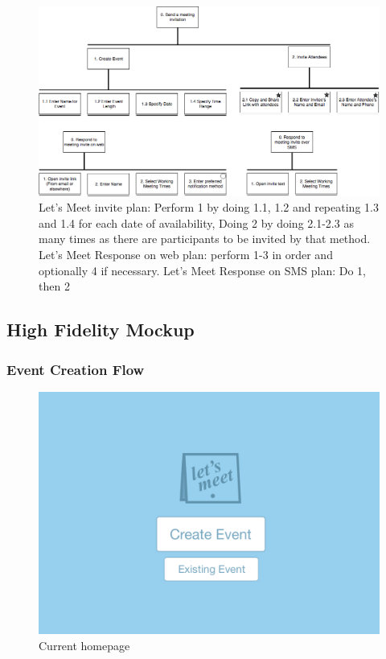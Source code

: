 \documentclass{sigchi}
\begin{document}
\FloatBarrier
\begin{figure}
  \centering
  \includegraphics[width=1.75\columnwidth]{figures/LetsMeetHTA}
  \caption{Let's Meet invite plan: Perform 1 by doing 1.1, 1.2 and repeating 1.3 and 1.4 for each date of availability, Doing 2 by doing 2.1-2.3 as many times as there are participants to be invited by that method. Let's Meet Response on web plan: perform 1-3 in order and optionally 4 if necessary. Let's Meet Response on SMS plan: Do 1, then 2}
\end{figure}
\FloatBarrier

\subsection{High Fidelity Mockup}

\subsubsection{Event Creation Flow}
\begin{figure}
  \centering
  \includegraphics[width=1.75\columnwidth]{Mockup/Home}
  \caption{Current homepage}
\end{figure}
\end{document}

